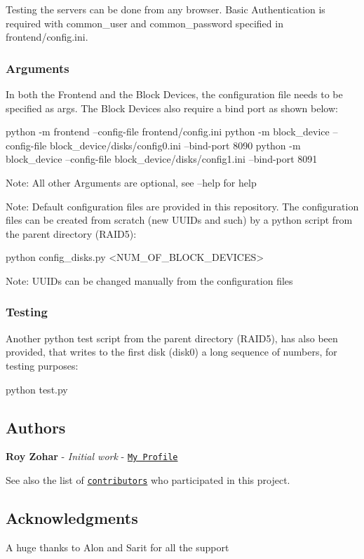 Testing the servers can be done from any browser. Basic Authentication is required with common\+\_\+user and common\+\_\+password specified in frontend/config.\+ini.

\subsubsection*{Arguments}

In both the Frontend and the Block Devices, the configuration file needs to be specified as args. The Block Devices also require a bind port as shown below\+: 
\begin{DoxyCode}
python -m frontend --config-file frontend/config.ini
python -m block\_device --config-file block\_device/disks/config0.ini --bind-port 8090
python -m block\_device --config-file block\_device/disks/config1.ini --bind-port 8091
\end{DoxyCode}
 Note\+: All other Arguments are optional, see --help for help

Note\+: Default configuration files are provided in this repository. The configuration files can be created from scratch (new U\+U\+I\+Ds and such) by a python script from the parent directory (R\+A\+I\+D5)\+: 
\begin{DoxyCode}
python config\_disks.py <NUM\_OF\_BLOCK\_DEVICES>
\end{DoxyCode}
 Note\+: U\+U\+ID\textquotesingle{}s can be changed manually from the configuration files

\subsubsection*{Testing}

Another python test script from the parent directory (R\+A\+I\+D5), has also been provided, that writes to the first disk (disk0) a long sequence of numbers, for testing purposes\+: 
\begin{DoxyCode}
python test.py
\end{DoxyCode}


\subsection*{Authors}


\begin{DoxyItemize}
\item {\bfseries Roy Zohar} -\/ {\itshape Initial work} -\/ \href{https://github.com/Royz2123}{\tt My Profile}
\end{DoxyItemize}

See also the list of \href{https://github.com/Royz2123/RAID5/contributors}{\tt contributors} who participated in this project.

\subsection*{Acknowledgments}


\begin{DoxyItemize}
\item A huge thanks to Alon and Sarit for all the support 
\end{DoxyItemize}